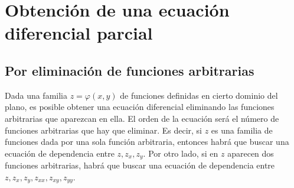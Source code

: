 \documentclass[11pt,letterpaper,draft]{report}
\theoremstyle{plain}
\theoremstyle{definition}
\theoremstyle{remark}
\newcommand\<{\langle}
\renewcommand\>{\rangle}
\renewcommand\phi\varphi
\begin{document}
\section{Obtención de una ecuación diferencial parcial}

\subsection{Por eliminación de funciones arbitrarias}

Dada una familia $z = \phi(x,y)$ de funciones definidas en
cierto dominio del plano, es posible obtener una ecuación
diferencial eliminando las funciones arbitrarias que
aparezcan en ella.
El orden de la ecuación será el número de funciones arbitrarias
que hay que eliminar.
Es decir, si \(z\) es una familia de funciones dada por una sola
función arbitraria, entonces habrá que buscar una ecuación de dependencia
entre \(z,z_x,z_y\). Por otro lado, si en \(z\) aparecen dos
funciones arbitrarias, habrá que buscar una ecuación de dependencia
entre \(z,z_x,z_y,z_{xx},z_{xy},z_{yy}\).
\end{document}
